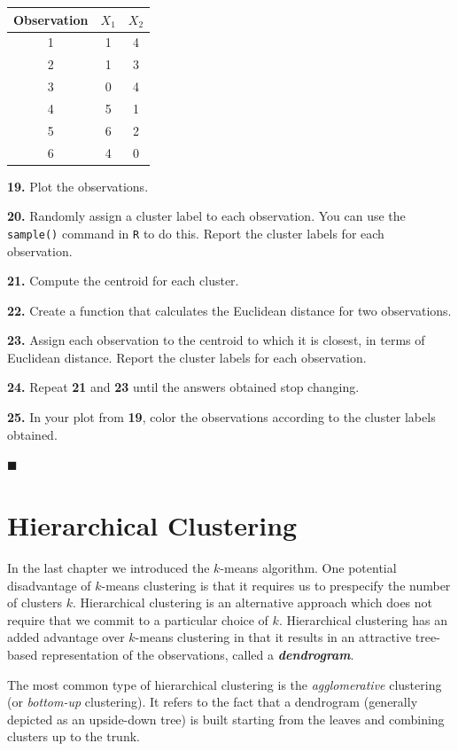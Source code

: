 \documentclass[]{book}
\theoremstyle{definition}
\theoremstyle{definition}
\theoremstyle{definition}
\theoremstyle{remark}
\begin{document}
\begin{longtable}[]{@{}ccc@{}}
\toprule
\textbf{Observation} & \textbf{\(X_1\)} &
\textbf{\(X_2\)}\tabularnewline
\midrule
\endhead
1 & 1 & 4\tabularnewline
2 & 1 & 3\tabularnewline
3 & 0 & 4\tabularnewline
4 & 5 & 1\tabularnewline
5 & 6 & 2\tabularnewline
6 & 4 & 0\tabularnewline
\bottomrule
\end{longtable}

\textbf{19.} Plot the observations.

\textbf{20.} Randomly assign a cluster label to each observation. You
can use the \texttt{sample()} command in \texttt{R} to do this. Report
the cluster labels for each observation.

\textbf{21.} Compute the centroid for each cluster.

\textbf{22.} Create a function that calculates the Euclidean distance
for two observations.

\textbf{23.} Assign each observation to the centroid to which it is
closest, in terms of Euclidean distance. Report the cluster labels for
each observation.

\textbf{24.} Repeat \textbf{21} and \textbf{23} until the answers
obtained stop changing.

\textbf{25.} In your plot from \textbf{19}, color the observations
according to the cluster labels obtained.

◼

\chapter{Hierarchical Clustering}\label{hierarchical-clustering}

In the last chapter we introduced the \(k\)-means algorithm. One
potential disadvantage of \(k\)-means clustering is that it requires us
to prespecify the number of clusters \(k\). Hierarchical clustering is
an alternative approach which does not require that we commit to a
particular choice of \(k\). Hierarchical clustering has an added
advantage over \(k\)-means clustering in that it results in an
attractive tree-based representation of the observations, called a
\textbf{\emph{dendrogram}}.

The most common type of hierarchical clustering is the
\emph{agglomerative} clustering (or \emph{bottom-up} clustering). It
refers to the fact that a dendrogram (generally depicted as an
upside-down tree) is built starting from the leaves and combining
clusters up to the trunk.
\end{document}
